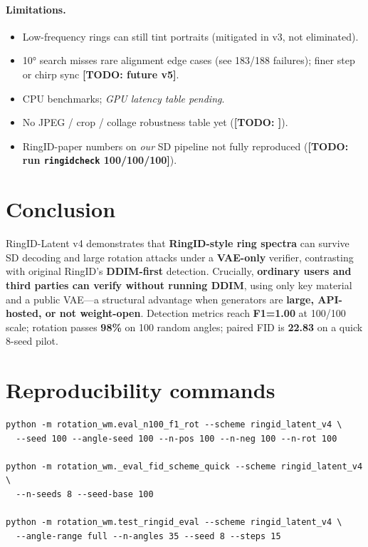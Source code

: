 \documentclass[11pt,a4paper]{article}
\newcommand{\placeholder}[1]{\textcolor{gray!70!black}{\textit{#1}}}
\newcommand{\todo}[1]{\textcolor{red!70!black}{\textbf{[TODO: #1]}}}
\newcommand{\metricgood}[1]{\textbf{\textcolor{green!40!black}{#1}}}
\begin{document}
\paragraph{Limitations.}
\begin{itemize}[nosep]
  \item Low-frequency rings can still tint portraits (mitigated in v3, not eliminated).
  \item 10° search misses rare alignment edge cases (see 183/188 failures); finer step or chirp sync \todo{future v5}.
  \item CPU benchmarks; \placeholder{GPU latency table pending}.
  \item No JPEG / crop / collage robustness table yet (\todo{}).
  \item RingID-paper numbers on \emph{our} SD pipeline not fully reproduced (\todo{run \texttt{ringidcheck} 100/100/100}).
\end{itemize}

\section{Conclusion}

RingID-Latent v4 demonstrates that \textbf{RingID-style ring spectra} can survive SD decoding and large rotation attacks under a \textbf{VAE-only} verifier, contrasting with original RingID's \textbf{DDIM-first} detection.
Crucially, \textbf{ordinary users and third parties can verify without running DDIM}, using only key material and a public VAE---a structural advantage when generators are \textbf{large, API-hosted, or not weight-open}.
Detection metrics reach \metricgood{F1=1.00} at 100/100 scale; rotation passes \metricgood{98\%} on 100 random angles; paired FID is \metricgood{22.83} on a quick 8-seed pilot.

\appendix
\section{Reproducibility commands}

\begin{verbatim}
python -m rotation_wm.eval_n100_f1_rot --scheme ringid_latent_v4 \
  --seed 100 --angle-seed 100 --n-pos 100 --n-neg 100 --n-rot 100

python -m rotation_wm._eval_fid_scheme_quick --scheme ringid_latent_v4 \
  --n-seeds 8 --seed-base 100

python -m rotation_wm.test_ringid_eval --scheme ringid_latent_v4 \
  --angle-range full --n-angles 35 --seed 8 --steps 15
\end{verbatim}
\end{document}
